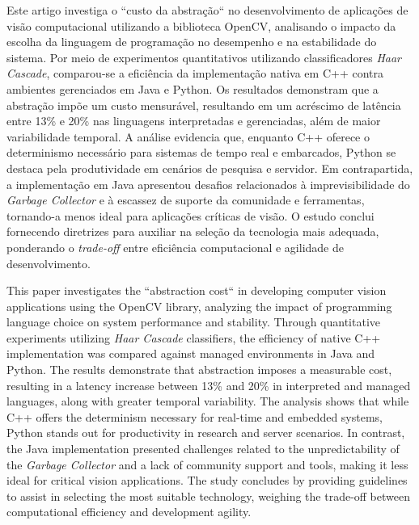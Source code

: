 \documentclass[portuguese]{sbc2025}%
\begin{document}

\begin{frontmatter}

\maketitle


\begin{abstract-pt}
Este artigo investiga o ``custo da abstração`` no desenvolvimento de aplicações de visão computacional utilizando a biblioteca OpenCV, analisando o impacto da escolha da linguagem de programação no desempenho e na estabilidade do sistema. Por meio de experimentos quantitativos utilizando classificadores \textit{Haar Cascade}, comparou-se a eficiência da implementação nativa em C++ contra ambientes gerenciados em Java e Python. Os resultados demonstram que a abstração impõe um custo mensurável, resultando em um acréscimo de latência entre 13\% e 20\% nas linguagens interpretadas e gerenciadas, além de maior variabilidade temporal. A análise evidencia que, enquanto C++ oferece o determinismo necessário para sistemas de tempo real e embarcados, Python se destaca pela produtividade em cenários de pesquisa e servidor. Em contrapartida, a implementação em Java apresentou desafios relacionados à imprevisibilidade do \textit{Garbage Collector} e à escassez de suporte da comunidade e ferramentas, tornando-a menos ideal para aplicações críticas de visão. O estudo conclui fornecendo diretrizes para auxiliar na seleção da tecnologia mais adequada, ponderando o \textit{trade-off} entre eficiência computacional e agilidade de desenvolvimento.
\end{abstract-pt}

\begin{abstract-en}
This paper investigates the ``abstraction cost`` in developing computer vision applications using the OpenCV library, analyzing the impact of programming language choice on system performance and stability. Through quantitative experiments utilizing \textit{Haar Cascade} classifiers, the efficiency of native C++ implementation was compared against managed environments in Java and Python. The results demonstrate that abstraction imposes a measurable cost, resulting in a latency increase between 13\% and 20\% in interpreted and managed languages, along with greater temporal variability. The analysis shows that while C++ offers the determinism necessary for real-time and embedded systems, Python stands out for productivity in research and server scenarios. In contrast, the Java implementation presented challenges related to the unpredictability of the \textit{Garbage Collector} and a lack of community support and tools, making it less ideal for critical vision applications. The study concludes by providing guidelines to assist in selecting the most suitable technology, weighing the trade-off between computational efficiency and development agility.
\end{abstract-en}


\end{frontmatter}
\end{document}
